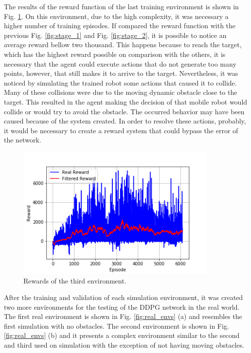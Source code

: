 The results of the reward function of the last training environment is shown in Fig. \ref{fig:stage_4}.
On this environment, due to the high complexity, it was necessary a higher number of training episodes.
If compared the reward function with the previous Fig. \ref{fig:stage_1} and Fig. \ref{fig:stage_2}, it is possible to notice an average reward bellow two thousand.
This happens because to reach the target, which has the highest reward possible on comparison with the others, it is necessary that the agent could execute actions that do not generate too many points, however, that still makes it to arrive to the target.
Nevertheless, it was noticed by simulating the trained robot some actions that caused it to collide.
Many of these collisions were due to the moving dynamic obstacle close to the target.
This resulted in the agent making the decision of that mobile robot would collide or would try to avoid the obstacle.
The occurred behavior may have been caused because of the system created.
In order to resolve these actions, probably, it would be necessary to create a reward system that could bypass the error of the network.

\begin{figure}[H]
\centerline{\includegraphics[width=10cm]{images/stage_4.png}}
\caption{Rewards of the third environment.}
\label{fig:stage_4}
\end{figure}


After the training and validation of each simulation environment, it was created two more environments for the testing of the DDPG network in the real world.
The first real environment is shown in Fig. \ref{fig:real_envs} (a) and resembles the first simulation with no obstacles. The second environment is shown in Fig. \ref{fig:real_envs} (b) and it presents a complex environment similar to the second and third used on simulation with the exception of not having moving obstacles.

